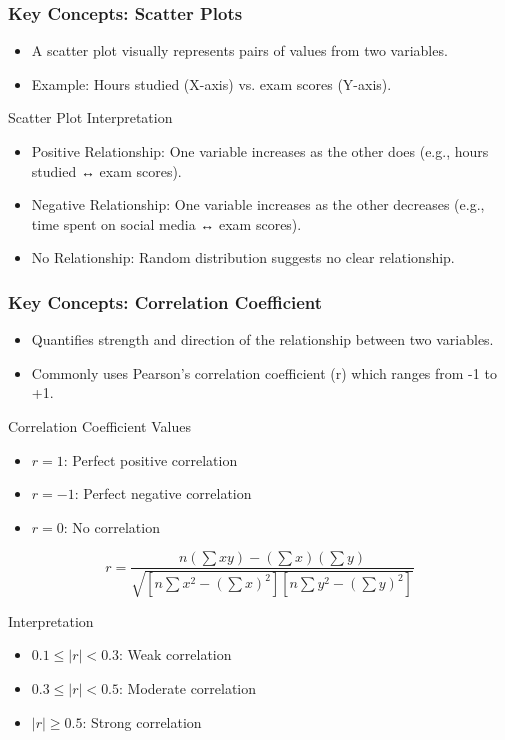 \documentclass{beamer}
\begin{document}
\begin{frame}[fragile]
    \frametitle{Key Concepts: Scatter Plots}
    \begin{itemize}
        \item A scatter plot visually represents pairs of values from two variables.
        \item Example: Hours studied (X-axis) vs. exam scores (Y-axis).
    \end{itemize}
    
    \begin{block}{Scatter Plot Interpretation}
        \begin{itemize}
            \item Positive Relationship: One variable increases as the other does (e.g., hours studied ↔ exam scores).
            \item Negative Relationship: One variable increases as the other decreases (e.g., time spent on social media ↔ exam scores).
            \item No Relationship: Random distribution suggests no clear relationship.
        \end{itemize}
    \end{block}
\end{frame}

\begin{frame}[fragile]
    \frametitle{Key Concepts: Correlation Coefficient}
    \begin{itemize}
        \item Quantifies strength and direction of the relationship between two variables.
        \item Commonly uses Pearson's correlation coefficient (r) which ranges from -1 to +1.
    \end{itemize}
    
    \begin{block}{Correlation Coefficient Values}
        \begin{itemize}
            \item $r = 1$: Perfect positive correlation
            \item $r = -1$: Perfect negative correlation
            \item $r = 0$: No correlation
        \end{itemize}
    \end{block}
    
    \begin{equation}
        r = \frac{n(\sum xy) - (\sum x)(\sum y)}{\sqrt{[n\sum x^2 - (\sum x)^2][n\sum y^2 - (\sum y)^2]}}
    \end{equation}
    
    \begin{block}{Interpretation}
        \begin{itemize}
            \item $0.1 \leq |r| < 0.3$: Weak correlation
            \item $0.3 \leq |r| < 0.5$: Moderate correlation
            \item $|r| \geq 0.5$: Strong correlation
        \end{itemize}
    \end{block}
\end{frame}
\end{document}
